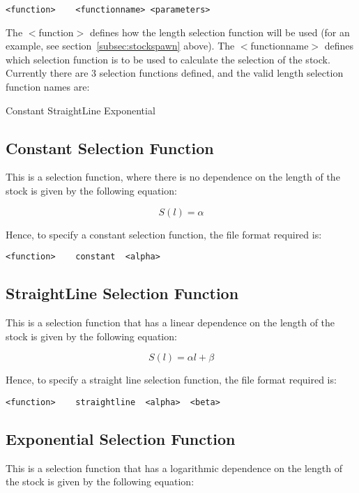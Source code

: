\documentclass [a4paper, 10pt]{book}
\begin{document}
{\small\begin{verbatim}
<function>    <functionname> <parameters>
\end{verbatim}}

The $<$function$>$ defines how the length selection function will be used (for an example, see section~\ref{subsec:stockspawn} above).  The $<$functionname$>$ defines which selection function is to be used to calculate the selection of the stock.  Currently there are 3 selection functions defined, and the valid length selection function names are:

\bigskip
Constant\newline
StraightLine\newline
Exponential

\subsection{Constant Selection Function}
This is a selection function, where there is no dependence on the length of the stock is given by the following equation:

\begin{equation}\label{eq:constsel}
S(l) = \alpha
\end{equation}

Hence, to specify a constant selection function, the file format required is:

{\small\begin{verbatim}
<function>    constant  <alpha>
\end{verbatim}}

\subsection{StraightLine Selection Function}
This is a selection function that has a linear dependence on the length of the stock is given by the following equation:

\begin{equation}\label{eq:straightsel}
S(l) = \alpha l + \beta
\end{equation}

\bigskip
Hence, to specify a straight line selection function, the file format required is:

{\small\begin{verbatim}
<function>    straightline  <alpha>  <beta>
\end{verbatim}}

\subsection{Exponential Selection Function}
This is a selection function that has a logarithmic dependence on the length of the stock is given by the following equation:
\end{document}
